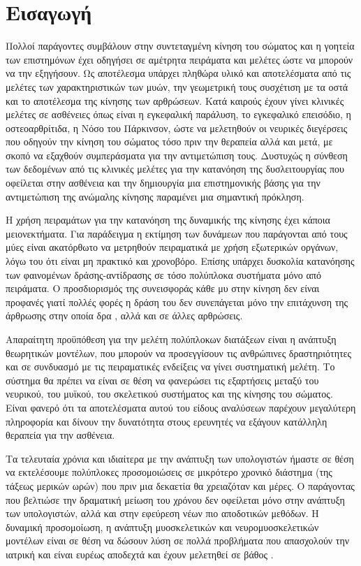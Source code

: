 \chapter{Εισαγωγή}

Πολλοί παράγοντες συμβάλουν στην συντεταγμένη κίνηση του σώματος και η γοητεία των επιστημόνων έχει οδηγήσει σε αμέτρητα πειράματα και μελέτες ώστε να μπορούν να την εξηγήσουν. Ως αποτέλεσμα υπάρχει πληθώρα υλικό και αποτελέσματα από τις μελέτες των χαρακτηριστικών των μυών, την γεωμετρική τους συσχέτιση με τα οστά και το αποτέλεσμα της κίνησης των αρθρώσεων. Κατά καιρούς έχουν γίνει κλινικές μελέτες σε ασθένειες όπως είναι η εγκεφαλική παράλυση, το εγκεφαλικό επεισόδιο, η οστεοαρθρίτιδα, η Νόσο του Πάρκινσον, ώστε να μελετηθούν οι νευρικές διεγέρσεις που οδηγούν την κίνηση του σώματος τόσο πριν την θεραπεία αλλά και μετά, με σκοπό να εξαχθούν συμπεράσματα για την αντιμετώπιση τους. Δυστυχώς η σύνθεση των δεδομένων από τις κλινικές μελέτες για την κατανόηση της δυσλειτουργίας που οφείλεται στην ασθένεια και την δημιουργία μια επιστημονικής βάσης για την αντιμετώπιση της ανώμαλης κίνησης παραμένει μια σημαντική πρόκληση.

Η χρήση πειραμάτων για την κατανόηση της δυναμικής της κίνησης έχει κάποια μειονεκτήματα. Για παράδειγμα η εκτίμηση των δυνάμεων που παράγονται από τους μύες είναι ακατόρθωτο να μετρηθούν πειραματικά με χρήση εξωτερικών οργάνων, λόγω του ότι είναι μη πρακτικό και χρονοβόρο. Επίσης υπάρχει δυσκολία κατανόησης των φαινομένων δράσης-αντίδρασης σε τόσο πολύπλοκα συστήματα μόνο από πειράματα. Ο προσδιορισμός της συνεισφοράς κάθε μυ στην κίνηση δεν είναι προφανές γιατί πολλές φορές η δράση του δεν συνεπάγεται μόνο την επιτάχυνση της άρθρωσης στην οποία δρα \cite{zajac-gordon89}, αλλά και σε άλλες αρθρώσεις.

Απαραίτητη προϋπόθεση για την μελέτη πολύπλοκων διατάξεων είναι η ανάπτυξη θεωρητικών μοντέλων, που μπορούν να προσεγγίσουν τις ανθρώπινες δραστηριότητες και σε συνδυασμό με τις πειραματικές ενδείξεις να γίνει συστηματική μελέτη. Το σύστημα θα πρέπει να είναι σε θέση να φανερώσει τις εξαρτήσεις μεταξύ του νευρικού, του μυϊκού, του σκελετικού συστήματος και της κίνησης του σώματος. Είναι φανερό ότι τα αποτελέσματα αυτού του είδους αναλύσεων παρέχουν μεγαλύτερη πληροφορία και δίνουν την δυνατότητα στους ερευνητές να εξάγουν κατάλληλη θεραπεία για την ασθένεια.

Τα τελευταία χρόνια και ιδιαίτερα με την ανάπτυξη των υπολογιστών ήμαστε σε θέση να εκτελέσουμε πολύπλοκες προσομοιώσεις σε μικρότερο χρονικό διάστημα (της τάξεως μερικών ωρών) που πριν μια δεκαετία θα χρειαζόταν και μέρες. Ο παράγοντας που βελτιώσε την δραματική μείωση του χρόνου δεν οφείλεται μόνο στην ανάπτυξη των υπολογιστών, αλλά και στην εφεύρεση νέων πιο αποδοτικών μεθόδων. Η δυναμική προσομοίωση, η ανάπτυξη μυοσκελετικών και νευρομυοσκελετικών μοντέλων είναι σε θέση να δώσουν λύση σε πολλά προβλήματα που απασχολούν την ιατρική και είναι ευρέως αποδεχτά και έχουν μελετηθεί σε βάθος \cite{thelen-chumanov06, piazza06, pandy01, zajac02}.

